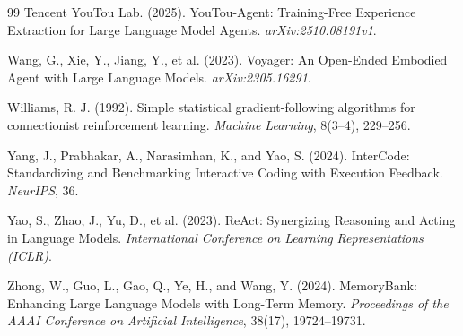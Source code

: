 \documentclass[11pt]{article}
\begin{document}
\begin{thebibliography}{99}
Tencent YouTou Lab. (2025).
\newblock YouTou-Agent: Training-Free Experience Extraction for Large Language
  Model Agents.
\newblock \emph{arXiv:2510.08191v1}.

Wang, G., Xie, Y., Jiang, Y., et al. (2023).
\newblock Voyager: An Open-Ended Embodied Agent with Large Language Models.
\newblock \emph{arXiv:2305.16291}.

Williams, R. J. (1992).
\newblock Simple statistical gradient-following algorithms for connectionist
  reinforcement learning.
\newblock \emph{Machine Learning}, 8(3--4), 229--256.

Yang, J., Prabhakar, A., Narasimhan, K., and Yao, S. (2024).
\newblock InterCode: Standardizing and Benchmarking Interactive Coding with
  Execution Feedback.
\newblock \emph{NeurIPS}, 36.

Yao, S., Zhao, J., Yu, D., et al. (2023).
\newblock ReAct: Synergizing Reasoning and Acting in Language Models.
\newblock \emph{International Conference on Learning Representations (ICLR)}.

Zhong, W., Guo, L., Gao, Q., Ye, H., and Wang, Y. (2024).
\newblock MemoryBank: Enhancing Large Language Models with Long-Term Memory.
\newblock \emph{Proceedings of the AAAI Conference on Artificial Intelligence},
  38(17), 19724--19731.

\end{thebibliography}
\end{document}
